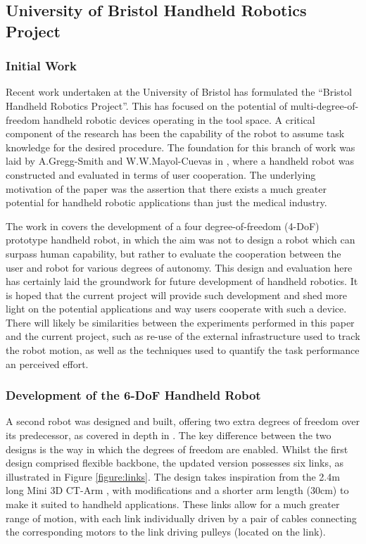 \documentclass[11pt]{article}
\begin{document}
\subsection{University of Bristol Handheld Robotics Project} \label{bristolhandheld}
\subsubsection{Initial Work}
Recent work undertaken at the University of Bristol has formulated the “Bristol Handheld Robotics Project”. This has focused on the potential of multi-degree-of-freedom handheld robotic devices operating in the tool space. A critical component of the research has been the capability of the robot to assume task knowledge for the desired procedure. The foundation for this branch of work was laid by A.Gregg-Smith and W.W.Mayol-Cuevas in \cite{GreggSmithDesign}, where a handheld robot was constructed and evaluated in terms of user cooperation. The underlying motivation of the paper was the assertion that there exists a much greater potential for handheld robotic applications than just the medical industry.

The work in \cite{GreggSmithDesign} covers the development of a four degree-of-freedom (4-DoF) prototype handheld robot, in which the aim was not to design a robot which can surpass human capability, but rather to evaluate the cooperation between the user and robot for various degrees of autonomy. This design and evaluation here has certainly laid the groundwork for future development of handheld robotics. It is hoped that the current project will provide such development and shed more light on the potential applications and way users cooperate with such a device. There will likely be similarities between the experiments performed in this paper and the current project, such as re-use of the external infrastructure used to track the robot motion, as well as the techniques used to quantify the task performance an perceived effort. 

\subsubsection{Development of the 6-DoF Handheld Robot}

A second robot was designed and built, offering two extra degrees of freedom over its predecessor, as covered in depth in \cite{GreggSmithKinematics}. The key difference between the two designs is the way in which the degrees of freedom are enabled. Whilst the first design comprised flexible backbone, the updated version possesses six links, as illustrated in Figure \ref{figure:links}. The design takes inspiration from the 2.4m long Mini 3D CT-Arm \cite{Horigome2014}, with modifications and a shorter arm length (30cm) to make it suited to handheld applications. These links allow for a much greater range of motion, with each link individually driven by a pair of cables connecting the corresponding motors to the link driving pulleys (located on the link).
\end{document}
